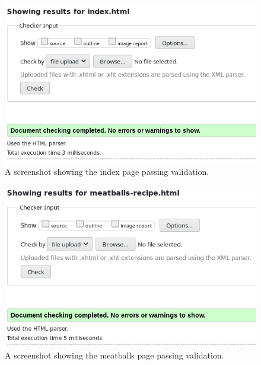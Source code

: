 \documentclass[a4paper]{scrartcl}
\begin{document}
\begin{figure}[h!]
    \begin{center}
        \includegraphics[scale=0.2]{images/index-validated.png}
        \caption{A screenshot showing the index page passing validation.}
        \label{fig:index-validated}
    \end{center}
\end{figure}

\begin{figure}[h!]
    \begin{center}
        \includegraphics[scale=0.2]{images/meatballs-validated.png}
        \caption{A screenshot showing the meatballs page passing validation.}
        \label{fig:meatballs-validated}
    \end{center}
\end{figure}
\end{document}
